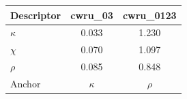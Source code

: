 \begin{tabular}{lcc}
\toprule
Descriptor & cwru\_03 & cwru\_0123 \\
\midrule
$\kappa$ & 0.033 & 1.230 \\
$\chi$ & 0.070 & 1.097 \\
$\rho$ & 0.085 & 0.848 \\
\midrule
Anchor & $\kappa$ & $\rho$ \\
\bottomrule
\end{tabular}
